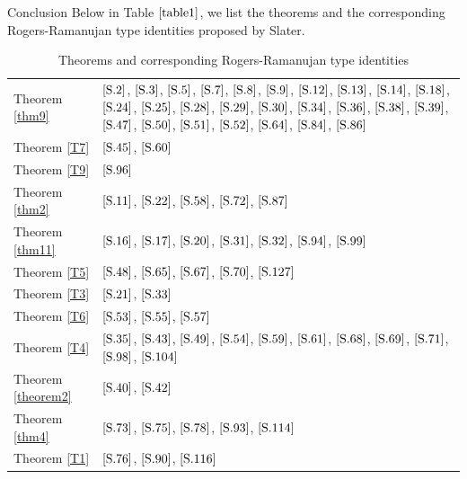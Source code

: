 \documentclass[reqno,12pt]{amsart}
\theoremstyle{remark}
\numberwithin{equation}{section}
\begin{document}
\begin{section}{Conclusion}
Below in Table $\ref{table1}$, we list the theorems and the corresponding  Rogers-Ramanujan type identities proposed by Slater.
\begin{table}[thbp]
\caption{Theorems and corresponding Rogers-Ramanujan type identities}\label{table1}
\centering
\begin{tabularx}{\textwidth}{lX}
  \toprule
  {Theorem \ref{thm9}} & $\eqref{S.2}$, $\eqref{S.3}$, $\eqref{S.5}$, $\eqref{S.7}$, $\eqref{S.8}$, $\eqref{S.9}$, $\eqref{S.12}$, $\eqref{S.13}$, $\eqref{S.14}$, $\eqref{S.18}$, $\eqref{S.24}$, $\eqref{S.25}$, $\eqref{S.28}$, $\eqref{S.29}$, $\eqref{S.30}$, $\eqref{S.34}$, $\eqref{S.36}$, $\eqref{S.38}$, $\eqref{S.39}$, $\eqref{S.47}$, $\eqref{S.50}$, $\eqref{S.51}$, $\eqref{S.52}$, $\eqref{S.64}$, $\eqref{S.84}$, $\eqref{S.86}$ \\
  Theorem \ref{T7} & $\eqref{S.45}$, $\eqref{S.60}$ \\
  Theorem \ref{T9} & $\eqref{S.96}$ \\
  Theorem \ref{thm2} & $\eqref{S.11}$, $\eqref{S.22}$, $\eqref{S.58}$, $\eqref{S.72}$, $\eqref{S.87}$ \\
  Theorem \ref{thm11} & $\eqref{S.16}$, $\eqref{S.17}$, $\eqref{S.20}$, $\eqref{S.31}$, $\eqref{S.32}$, $\eqref{S.94}$, $\eqref{S.99}$ \\
  Theorem \ref{T5} & $\eqref{S.48}$, $\eqref{S.65}$, $\eqref{S.67}$, $\eqref{S.70}$, $\eqref{S.127}$ \\
  Theorem \ref{T3} & $\eqref{S.21}$, $\eqref{S.33}$ \\
  Theorem \ref{T6} & $\eqref{S.53}$, $\eqref{S.55}$, $\eqref{S.57}$ \\
  Theorem \ref{T4} & $\eqref{S.35}$, $\eqref{S.43}$, $\eqref{S.49}$, $\eqref{S.54}$, $\eqref{S.59}$, $\eqref{S.61}$, $\eqref{S.68}$, $\eqref{S.69}$, $\eqref{S.71}$, $\eqref{S.98}$,  $\eqref{S.104}$ \\
  Theorem \ref{theorem2} & $\eqref{S.40}$, $\eqref{S.42}$\\
  Theorem \ref{thm4} & $\eqref{S.73}$, $\eqref{S.75}$, $\eqref{S.78}$, $\eqref{S.93}$, $\eqref{S.114}$\\
  Theorem \ref{T1} & $\eqref{S.76}$, $\eqref{S.90}$, $\eqref{S.116}$\\
  \bottomrule

\end{tabularx}
\end{table}
\end{section}
\end{document}

